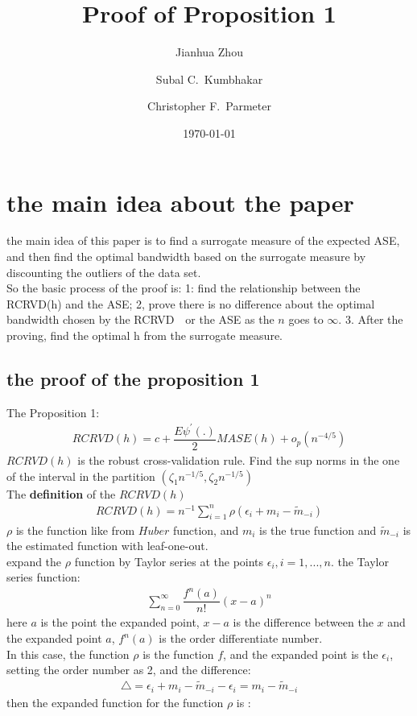 \documentclass[12pt]{amsart}
\title[Appendix: Sketches of the proofs]{Proof of Proposition 1}
\author{Jianhua Zhou}
\author{Subal C.~Kumbhakar}
\author{Christopher F.~Parmeter}
\date{\today}
\begin{document}
\section{the main idea about the paper}
the main idea of this paper is to find a surrogate measure of the expected ASE, and then find the optimal bandwidth based on the surrogate measure by discounting the outliers of the data set.\\
So the basic process of the proof is: 1: find the relationship between the RCRVD(h) and the ASE; 2, prove there is no difference about the optimal bandwidth chosen by the RCRVD　or the ASE as the $n$ goes to $\infty$. 3. After the proving, find the optimal h from the surrogate measure.\\
\subsection{the proof of the proposition 1}
The Proposition 1:
\begin{align}
RCRVD(h)=c+\dfrac{E\psi^{'}(.)}{2}MASE(h)+o_{p}(n^{-4/5}) \nonumber
\end{align}
$RCRVD(h)$ is the robust cross-validation rule.
Find the sup norms in the one of the interval in the partition $(\zeta_{1}n^{-1/5},\zeta_{2}n^{-1/5})$\\
The \textbf{definition} of the $ RCRVD(h)$
\begin{align}
RCRVD(h)=n^{-1}\sum_{i=1}^{n}\rho(\epsilon_{i}+m_{i}-\widetilde{m}_{-i})
\end{align}
$\rho$ is the function like from $Huber$ function, and $m_{i}$ is the true function and $\widetilde{m}_{-i}$ is the estimated function with leaf-one-out.\\
expand the $\rho$ function by Taylor series at the points $\epsilon_{i},i=1,...,n$.
the Taylor series function:
\begin{align}
\sum^{\infty}_{n=0}\dfrac{f^{n}(a)}{n!}(x-a)^{n}\nonumber
\end{align}
here $a$ is the point the expanded point, $x-a$ is the difference between the $x$ and the expanded point $a$, $f^{n}(a)$ is the order differentiate number.\\
In this case, the function $\rho$ is the function $f$, and the expanded point is the $\epsilon_{i}$, setting the order number as 2, and the difference: 
\begin{align}
\triangle=\epsilon_{i}+m_{i}-\widetilde{m}_{-i}-\epsilon_{i}=m_{i}-\widetilde{m}_{-i}\nonumber
\end{align}
then the expanded function for the function $\rho$ is :
\end{document}
